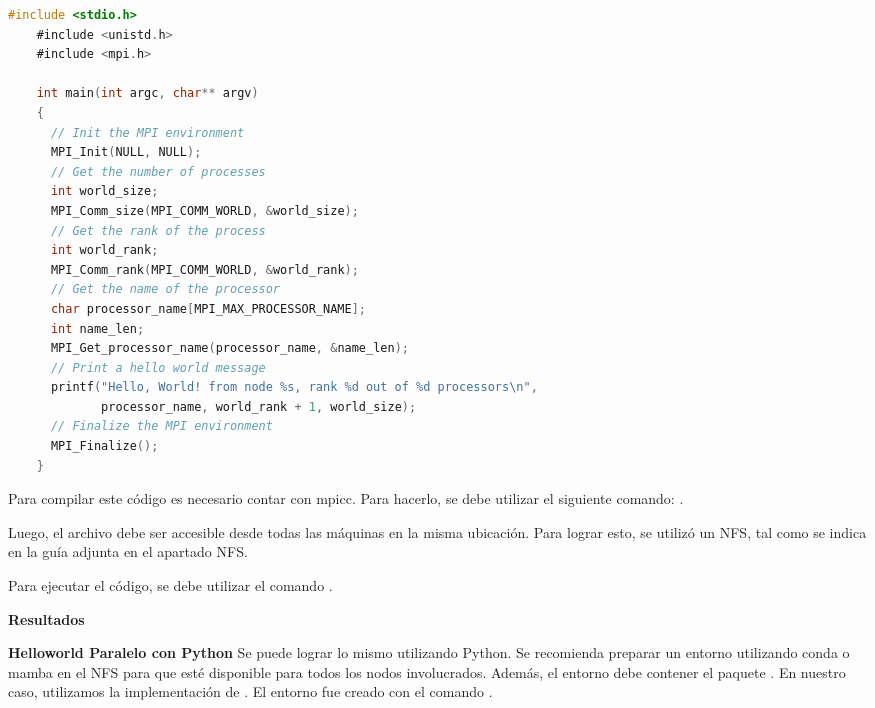 \begin{spacing}{1.5}

\begin{lstlisting}[language=C]
    #include <stdio.h>
    #include <unistd.h>
    #include <mpi.h>
    
    int main(int argc, char** argv)
    {
      // Init the MPI environment
      MPI_Init(NULL, NULL);
      // Get the number of processes
      int world_size;
      MPI_Comm_size(MPI_COMM_WORLD, &world_size);
      // Get the rank of the process
      int world_rank;
      MPI_Comm_rank(MPI_COMM_WORLD, &world_rank);
      // Get the name of the processor
      char processor_name[MPI_MAX_PROCESSOR_NAME];
      int name_len;
      MPI_Get_processor_name(processor_name, &name_len);
      // Print a hello world message
      printf("Hello, World! from node %s, rank %d out of %d processors\n",
             processor_name, world_rank + 1, world_size);
      // Finalize the MPI environment
      MPI_Finalize();
    }
    \end{lstlisting}
    
    Para compilar este código es necesario contar con mpicc. Para hacerlo, se debe utilizar el siguiente comando: .

    Luego, el archivo debe ser accesible desde todas las máquinas en la misma ubicación. Para lograr esto, se utilizó un NFS, tal como se indica en la guía adjunta en el apartado NFS.
    
    Para ejecutar el código, se debe utilizar el comando .

    \textbf{Resultados}

    \textbf{Helloworld Paralelo con Python} 
    Se puede lograr lo mismo utilizando Python. Se recomienda preparar un entorno utilizando conda o mamba en el NFS para que esté disponible para todos los nodos involucrados. Además, el entorno debe contener el paquete . En nuestro caso, utilizamos la implementación de . El entorno fue creado con el comando .


\end{spacing}
